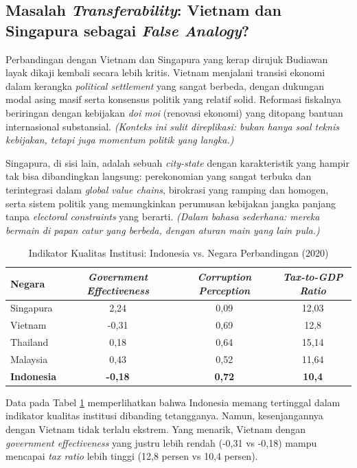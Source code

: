 \subsection{Masalah \textit{Transferability}: Vietnam dan Singapura sebagai \textit{False Analogy}?}
Perbandingan dengan Vietnam dan Singapura yang kerap dirujuk Budiawan layak dikaji kembali secara lebih kritis. Vietnam menjalani transisi ekonomi dalam kerangka \textit{political settlement} yang sangat berbeda, dengan dukungan modal asing masif serta konsensus politik yang relatif solid. Reformasi fiskalnya beriringan dengan kebijakan \textit{doi moi} (renovasi ekonomi) yang ditopang bantuan internasional substansial.
\textit{(Konteks ini sulit direplikasi: bukan hanya soal teknis kebijakan, tetapi juga momentum politik yang langka.)}

Singapura, di sisi lain, adalah sebuah \textit{city-state} dengan karakteristik yang hampir tak bisa dibandingkan langsung: perekonomian yang sangat terbuka dan terintegrasi dalam \textit{global value chains}, birokrasi yang ramping dan homogen, serta sistem politik yang memungkinkan perumusan kebijakan jangka panjang tanpa \textit{electoral constraints} yang berarti.
\textit{(Dalam bahasa sederhana: mereka bermain di papan catur yang berbeda, dengan aturan main yang lain pula.)}

\begin{table}[hbt!]
\caption{Indikator Kualitas Institusi: Indonesia vs. Negara Perbandingan (2020)}
\label{tab:institutional_quality}
\centering
\begin{tabular}{lccc}
\textbf{Negara} & \textbf{\textit{Government Effectiveness}} & \textbf{\textit{Corruption Perception}} & \textbf{\textit{Tax-to-GDP Ratio}} \\
\midrule
Singapura & 2,24 & 0,09 & 12,03 \\
Vietnam & -0,31 & 0,69 & 12,8 \\
Thailand & 0,18 & 0,64 & 15,14 \\
Malaysia & 0,43 & 0,52 & 11,64 \\
\textbf{Indonesia} & \textbf{-0,18} & \textbf{0,72} & \textbf{10,4} \\
\end{tabular}
\end{table}

Data pada Tabel \ref{tab:institutional_quality} memperlihatkan bahwa Indonesia memang tertinggal dalam indikator kualitas institusi dibanding tetangganya. Namun, kesenjangannya dengan Vietnam tidak terlalu ekstrem. Yang menarik, Vietnam dengan \textit{government effectiveness} yang justru lebih rendah (-0,31 vs -0,18) mampu mencapai \textit{tax ratio} lebih tinggi (12,8 persen vs 10,4 persen).

